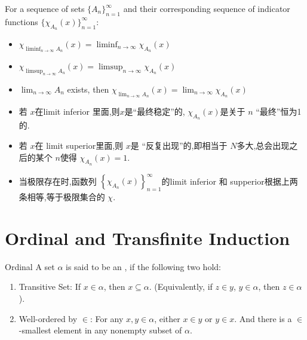 \documentclass[../main.tex]{subfiles}
\begin{document}
\begin{proposition}{}{}
    For a sequence of sets $\{A_n\}_{n=1}^\infty$ and their corresponding sequence of indicator functions $\{\chi_{A_n}(x)\}_{n=1}^\infty$:
    \begin{itemize}
        \item 
$\chi_{\liminf_{n \to \infty} A_n}(x) = \liminf_{n \to \infty} \chi_{A_n}(x)$
\item $\chi_{\limsup_{n \to \infty} A_n}(x) = \limsup_{n \to \infty} \chi_{A_n}(x)$
\item  $\lim_{n \to \infty} A_n$ exists, then
$\chi_{\lim_{n \to \infty} A_n}(x) = \lim_{n \to \infty} \chi_{A_n}(x)$
    \end{itemize}
    
\end{proposition}
\begin{proofsketch}
    \begin{itemize}
        \item 若 \(  x  \)在limit inferior 里面,则\(  x  \)是“最终稳定”的, \(  \chi _{A_{n}}\left( x \right)   \)是关于 \(  n  \) “最终”恒为1的.
        \item 若 \(  x  \)在 limit superior里面,则 \(  x  \)是  “反复出现”的,即相当于 \(  N  \)多大,总会出现之后的某个 \(  n  \)使得 \(  \chi _{A_{n}}\left( x \right)= 1   \).
        \item 当极限存在时,函数列 \(  \left\{ \chi _{A_{n}}\left( x \right)  \right\}_{n = 1}^{\infty}  \)的limit inferior 和 supperior根据上两条相等,等于极限集合的 \(  \chi   \). 
    \end{itemize}
    
\end{proofsketch}

\section{Ordinal and Transfinite Induction}

\begin{definition}{Ordinal}{}
    A set \(  \alpha   \) is said to be an , if the following two hold:
    \begin{enumerate}
        \item Transitive Set: If \(  x \in \alpha   \), then \(  x\subseteq \alpha   \). (Equivalently, if \(  z \in y  \), \(  y \in \alpha   \), then \(  z \in \alpha   \)   ).
        \item Well-ordered by \(  \in   \): For any \(  x,y \in \alpha   \), either \(  x \in y  \) or \(  y \in x  \).     And there is a \(  \in   \)-smallest element in any nonempty subset of \(  \alpha   \).       
    \end{enumerate}
     
\end{definition}
\end{document}
